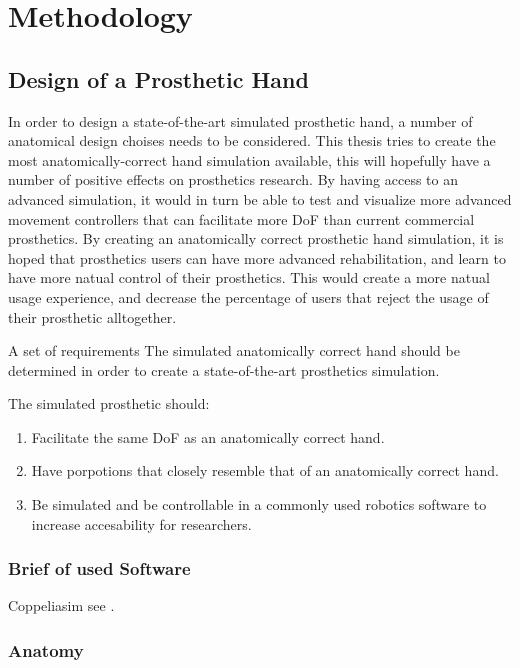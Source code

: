 \documentclass[../main.tex]{subfiles}
\begin{document}
\section{Methodology}

\subsection{Design of a Prosthetic Hand}

In order to design a state-of-the-art simulated prosthetic hand, a number of anatomical design choises needs to be considered.
This thesis tries to create the most anatomically-correct hand simulation available, this will hopefully have a number of positive effects on prosthetics research.
By having access to an advanced simulation, it would in turn be able to test and visualize more advanced movement controllers that can facilitate more DoF than current commercial prosthetics. 
By creating an anatomically correct prosthetic hand simulation, it is hoped that prosthetics users can have more advanced rehabilitation, and learn to have more natual control of their prosthetics. This would create a more natual usage experience, and decrease the percentage of users that reject the usage of their prosthetic alltogether.

A set of requirements The simulated anatomically correct hand should be determined in order to create a state-of-the-art prosthetics simulation.

The simulated prosthetic should:

\begin{enumerate}
\item Facilitate the same DoF as an anatomically correct hand.
\item Have porpotions that closely resemble that of an anatomically correct hand.
\item Be simulated and be controllable in a commonly used robotics software to increase accesability for researchers.
\end{enumerate}


\subsubsection{Brief of used Software}
\label{sec:software}

Coppeliasim see \cite{coppeliasim}.

\subsubsection{Anatomy}
\label{sec:anatomy}
\end{document}
